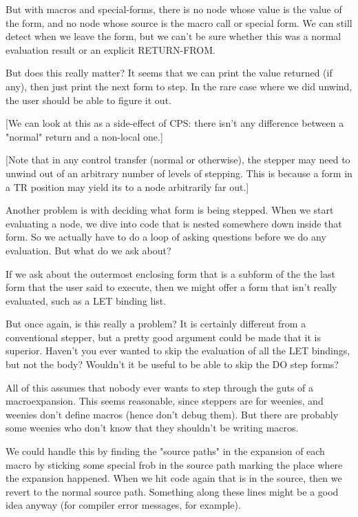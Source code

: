 But with macros and special-forms, there is no node whose value is the value of
the form, and no node whose source is the macro call or special form.  We can
still detect when we leave the form, but we can't be sure whether this was a
normal evaluation result or an explicit RETURN-FROM.  

But does this really matter?  It seems that we can print the value returned (if
any), then just print the next form to step.  In the rare case where we did
unwind, the user should be able to figure it out.  

[We can look at this as a side-effect of CPS: there isn't any difference
between a "normal" return and a non-local one.]

[Note that in any control transfer (normal or otherwise), the stepper may need
to unwind out of an arbitrary number of levels of stepping.  This is because a
form in a TR position may yield its to a node arbitrarily far out.]

Another problem is with deciding what form is being stepped.  When we start
evaluating a node, we dive into code that is nested somewhere down inside that
form.  So we actually have to do a loop of asking questions before we do any
evaluation.  But what do we ask about?

If we ask about the outermost enclosing form that is a subform of the the last
form that the user said to execute, then we might offer a form that isn't
really evaluated, such as a LET binding list.  

But once again, is this really a problem?  It is certainly different from a
conventional stepper, but a pretty good argument could be made that it is
superior.  Haven't you ever wanted to skip the evaluation of all the
LET bindings, but not the body?  Wouldn't it be useful to be able to skip the
DO step forms?

All of this assumes that nobody ever wants to step through the guts of a
macroexpansion.  This seems reasonable, since steppers are for weenies, and
weenies don't define macros (hence don't debug them).  But there are probably
some weenies who don't know that they shouldn't be writing macros.

We could handle this by finding the "source paths" in the expansion of each
macro by sticking some special frob in the source path marking the place where
the expansion happened.  When we hit code again that is in the source, then we
revert to the normal source path.  Something along these lines might be a good
idea anyway (for compiler error messages, for example).  

